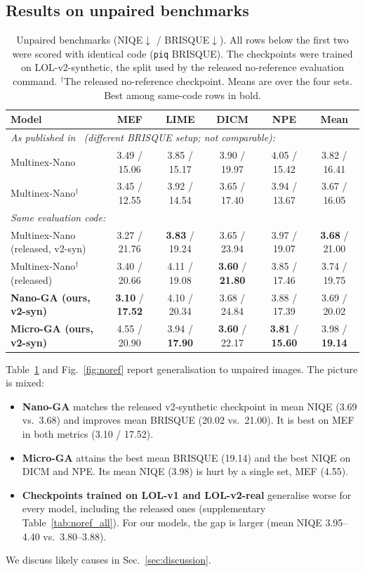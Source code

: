\documentclass[10pt,twocolumn,letterpaper]{article}
\newcommand{\best}[1]{\textbf{#1}}
\begin{document}
\subsection{Results on unpaired benchmarks}
\begin{table}[t]
\centering
\caption{Unpaired benchmarks (NIQE$\downarrow$ / BRISQUE$\downarrow$). All rows below the
first two were scored with identical code (\texttt{piq} BRISQUE). The checkpoints
were trained on LOL-v2-synthetic, the split used by the released no-reference
evaluation command. $^\dagger$The released no-reference checkpoint. Means are
over the four sets. Best among same-code rows in bold.}
\label{tab:noref}
\small
\begin{tabular}{lccccc}
\toprule
Model & MEF & LIME & DICM & NPE & Mean \\
\midrule
\multicolumn{6}{l}{\emph{As published in~\cite{brateanu2026multinex} (different BRISQUE setup; not comparable):}} \\
Multinex-Nano            & 3.49 / 15.06 & 3.85 / 15.17 & 3.90 / 19.97 & 4.05 / 15.42 & 3.82 / 16.41 \\
Multinex-Nano$^\dagger$  & 3.45 / 12.55 & 3.92 / 14.54 & 3.65 / 17.40 & 3.94 / 13.67 & 3.67 / 16.05 \\
\midrule
\multicolumn{6}{l}{\emph{Same evaluation code:}} \\
Multinex-Nano (released, v2-syn)       & 3.27 / 21.76 & \best{3.83} / 19.24 & 3.65 / 23.94 & 3.97 / 19.07 & \best{3.68} / 21.00 \\
Multinex-Nano$^\dagger$ (released)     & 3.40 / 20.66 & 4.11 / 19.08 & \best{3.60} / \best{21.80} & 3.85 / 17.46 & 3.74 / 19.75 \\
\textbf{Nano-GA (ours, v2-syn)}        & \best{3.10} / \best{17.52} & 4.10 / 20.34 & 3.68 / 24.84 & 3.88 / 17.39 & 3.69 / 20.02 \\
\textbf{Micro-GA (ours, v2-syn)}       & 4.55 / 20.90 & 3.94 / \best{17.90} & \best{3.60} / 22.17 & \best{3.81} / \best{15.60} & 3.98 / \best{19.14} \\
\bottomrule
\end{tabular}
\end{table}

Table~\ref{tab:noref} and Fig.~\ref{fig:noref} report generalisation to unpaired
images. The picture is mixed:
\begin{itemize}
  \item \textbf{Nano-GA} matches the released v2-synthetic checkpoint in mean NIQE
  (3.69 vs.\ 3.68) and improves mean BRISQUE (20.02 vs.\ 21.00). It is best on MEF
  in both metrics (3.10 / 17.52).
  \item \textbf{Micro-GA} attains the best mean BRISQUE (19.14) and the best NIQE on
  DICM and NPE. Its mean NIQE (3.98) is hurt by a single set, MEF (4.55).
  \item \textbf{Checkpoints trained on LOL-v1 and LOL-v2-real} generalise worse
  for every model, including the released ones (supplementary Table~\ref{tab:noref_all}).
  For our models, the gap is larger (mean NIQE 3.95--4.40 vs.\ 3.80--3.88).
\end{itemize}
We discuss likely causes in Sec.~\ref{sec:discussion}.
\end{document}
